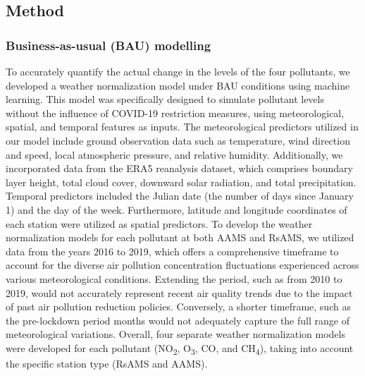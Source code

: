 \subsection{Method} \label{chap4_method}
\subsubsection*{Business-as-usual (BAU) modelling}
To accurately quantify the actual change in the levels of the four pollutants, we developed a weather normalization model under BAU conditions using machine learning. This model was specifically designed to simulate pollutant levels without the influence of COVID-19 restriction measures, using meteorological, spatial, and temporal features as inputs. The meteorological predictors utilized in our model include ground observation data such as temperature, wind direction and speed, local atmospheric pressure, and relative humidity. Additionally, we incorporated data from the ERA5 reanalysis dataset, which comprises boundary layer height, total cloud cover, downward solar radiation, and total precipitation. Temporal predictors included the Julian date (the number of days since January 1) and the day of the week. Furthermore, latitude and longitude coordinates of each station were utilized as spatial predictors. To develop the weather normalization models for each pollutant at both AAMS and RsAMS, we utilized data from the years 2016 to 2019, which offers a comprehensive timeframe to account for the diverse air pollution concentration fluctuations experienced across various meteorological conditions. Extending the period, such as from 2010 to 2019, would not accurately represent recent air quality trends due to the impact of past air pollution reduction policies. Conversely, a shorter timeframe, such as the pre-lockdown period months would not adequately capture the full range of meteorological variations. Overall, four separate weather normalization models were developed for each pollutant (NO\textsubscript{2}, O\textsubscript{3}, CO, and CH\textsubscript{4}), taking into account the specific station type (RsAMS and AAMS). \par

